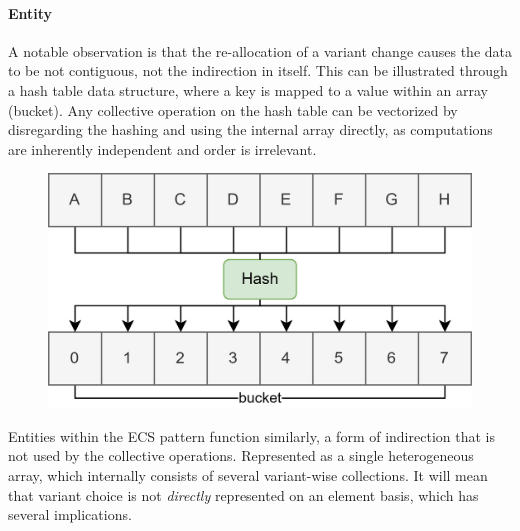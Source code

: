 \documentclass{article}
\begin{document}
\newpage

\paragraph{Entity}

A notable observation is that the re-allocation of a variant change causes the data to be not contiguous, not the indirection in itself.
This can be illustrated through a hash table data structure, where a key is mapped to a value within an array (bucket).
Any collective operation on the hash table can be vectorized by disregarding the hashing and using the internal array directly, as computations are inherently independent and order is irrelevant.   

\begin{figure}[ht]
    \centering
    \includegraphics[scale=0.1]{hashtable}
\end{figure}

Entities within the ECS pattern function similarly, a form of indirection that is not used by the collective operations. 
Represented as a single heterogeneous array, which internally consists of several variant-wise collections. 
It will mean that variant choice is not {\it directly} represented on an element basis, which has several implications.
\end{document}
